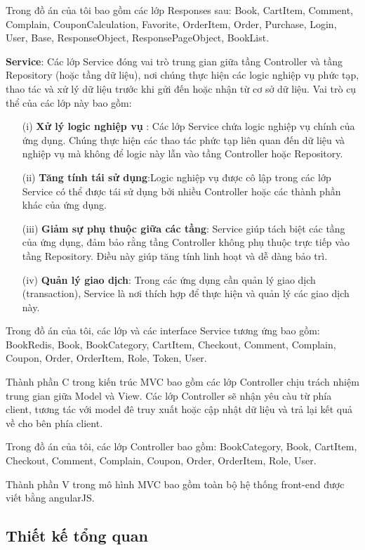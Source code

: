 \documentclass[../DoAn.tex]{subfiles}
\begin{document}
Trong đồ án của tôi bao gồm các lớp Responses sau: Book, CartItem, Comment, Complain, CouponCalculation, Favorite, OrderItem, Order, Purchase, Login, User, Base, ResponseObject, ResponsePageObject, BookList.

\textbf{Service}: Các lớp Service đóng vai trò trung gian giữa tầng Controller và tầng Repository (hoặc tầng dữ liệu), nơi chúng thực hiện các logic nghiệp vụ phức tạp, thao tác và xử lý dữ liệu trước khi gửi đến hoặc nhận từ cơ sở dữ liệu. Vai trò cụ thể của các lớp này bao gồm:

\begin{enumerate}
  \item[(i)] \textbf{Xử lý logic nghiệp vụ }: Các lớp Service chứa logic nghiệp vụ chính của ứng dụng. Chúng thực hiện các thao tác phức tạp liên quan đến dữ liệu và nghiệp vụ mà không để logic này lẫn vào tầng Controller hoặc Repository.
  \item[(ii)] \textbf{Tăng tính tái sử dụng}:Logic nghiệp vụ được cô lập trong các lớp Service có thể được tái sử dụng bởi nhiều Controller hoặc các thành phần khác của ứng dụng.
  \item[(iii)] \textbf{Giảm sự phụ thuộc giữa các tầng}: Service giúp tách biệt các tầng của ứng dụng, đảm bảo rằng tầng Controller không phụ thuộc trực tiếp vào tầng Repository. Điều này giúp tăng tính linh hoạt và dễ dàng bảo trì.
  \item[(iv)] \textbf{Quản lý giao dịch}:  Trong các ứng dụng cần quản lý giao dịch (transaction), Service là nơi thích hợp để thực hiện và quản lý các giao dịch này.
\end{enumerate}

Trong đồ án của tôi, các lớp và các interface Service tương ứng bao gồm: BookRedis, Book, BookCategory, CartItem, Checkout, Comment, Complain, Coupon, Order, OrderItem, Role, Token, User.

Thành phần C trong kiến trúc MVC bao gồm các lớp Controller chịu trách nhiệm trung gian giữa Model và View. Các lớp Controller sẽ nhận yêu càu từ phía client, tương tác với model đê truy xuất hoặc cập nhật dữ liệu và trả lại kết quả về cho bên phía client.

Trong đồ án của tôi, các lớp Controller bao gồm: BookCategory, Book, CartItem, Checkout, Comment, Complain, Coupon, Order, OrderItem, Role, User.

Thành phần V trong mô hình MVC bao gồm toàn bộ hệ thống front-end được viết bằng angularJS.


\subsection{Thiết kế tổng quan}
\end{document}
